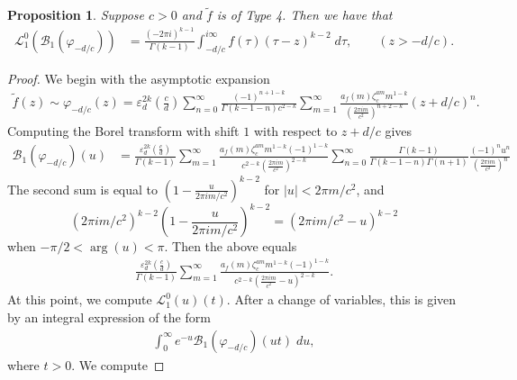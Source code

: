 \documentclass[12pt]{amsart}
\theoremstyle{definition}
\theoremstyle{plain}
\newtheorem{prop}[theorem]{Proposition}
\numberwithin{equation}{section}
\begin{document}
\begin{prop}\label{prop: obstruction}
Suppose $c>0$ and $\tilde{f}$ is of Type 4. Then we have that
\begin{align*}\mathcal{L}^0_1(\mathcal{B}_1(\varphi_{-d/c})) &=
  \frac{(-2\pi i)^{k-1}}{\Gamma(k-1)} \int_{-d/c}^{i\infty} f(\tau)\left(\tau- z\right)^{k-2}\;d\tau, \quad \quad (z > -d/c).
\end{align*} 

\end{prop}
\begin{proof}
	We begin with the asymptotic expansion 
\begin{align*}
\tilde{f}(z) \sim \varphi_{-d/c}(z) = \varepsilon_d^{2k} \left( \frac{c}{d}\right)   \sum_{n=0}^\infty \frac{(-1)^{n+1-k}}{\Gamma(k-1-n) c^{2-k}} \sum_{m=1}^\infty \frac{a_f(m)\zeta_c^{am}m^{1-k}}{\left( \frac{2\pi i m}{c^2}\right)^{n+2-k}}( z+d/c)^{n}.
\end{align*}
Computing the Borel transform with shift $1$ with respect to $z+d/c$ gives
\begin{align*}\mathcal{B}_1(\varphi_{-d/c})(u) 
&= \frac{\varepsilon_d^{2k} \left( \frac{c}{d}\right) }{\Gamma(k-1)} \sum_{m=1}^\infty \frac{a_f(m)\zeta_c^{am}m^{1-k}(-1)^{1-k}}{c^{2-k}\left( \frac{2\pi i m}{c^2}\right)^{2-k}} \sum_{n=0}^\infty \frac{\Gamma(k-1)}{\Gamma(k-1-n) \Gamma(n+1)}\frac{(-1)^nu^{n}}{\left( \frac{2\pi i m}{c^2}\right)^{n}}
\end{align*}
The second sum is equal to $(1- \frac{u}{2\pi im/c^2})^{k-2}$ for $|u| < 2\pi m/c^2$, and \[(2\pi i m/c^2)^{k-2} \left(1- \frac{u}{2\pi im/c^2}\right)^{k-2} = (2\pi i m/c^2 - u)^{k-2}\] when $-\pi/2 < \arg(u) < \pi$. Then the above equals
\begin{align*}
\frac{\varepsilon_d^{2k} \left( \frac{c}{d}\right) }{\Gamma(k-1)}  \sum_{m=1}^\infty \frac{a_f(m)\zeta_c^{am}m^{1-k}(-1)^{1-k}}{c^{2-k}\left( \frac{2\pi i m}{c^2}- u \right)^{2-k}} .\end{align*}	
At this point, we compute $\mathcal{L}^0_1(u)(t)$. After a change of variables, this is given by an integral expression of the form
\begin{align*}
	\int_0^\infty e^{-u} \mathcal{B}_1(\varphi_{-d/c})(ut)\;du, 
\end{align*}
where $t>0$. We compute

\end{proof}
\end{document}
